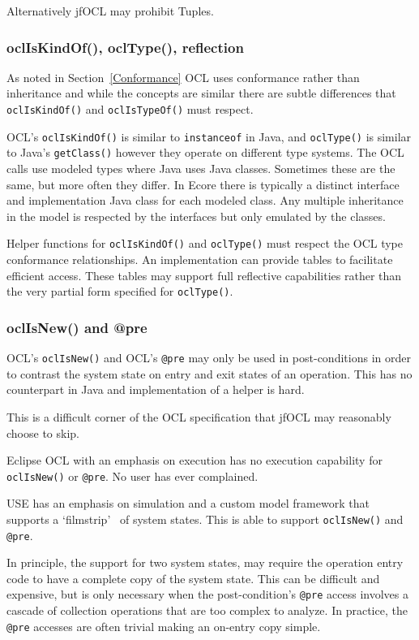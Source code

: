 \documentclass[sigconf]{acmart}
\begin{document}
Alternatively jfOCL may prohibit Tuples.

\subsubsection{oclIsKindOf(), oclType(), reflection}

As noted in Section~\ref{Conformance} OCL uses conformance rather than inheritance and while the concepts are similar there are subtle differences that \texttt{oclIsKindOf()} and \texttt{oclIsTypeOf()} must respect.

OCL's \texttt{oclIsKindOf()} is similar to \texttt{instanceof} in Java, and
\texttt{oclType()} is similar to Java's \texttt{getClass()} however they operate on different type systems. The OCL calls use modeled types where Java uses Java classes. Sometimes these are the same, but more often they differ. In Ecore there is typically a distinct interface and implementation Java class for each modeled class. Any multiple inheritance in the model is respected by the interfaces but only emulated by the classes.

Helper functions for \texttt{oclIsKindOf()} and \texttt{oclType()} must respect the OCL type conformance relationships. An implementation can provide tables to facilitate efficient access. These tables may support full reflective capabilities rather than the very partial form specified for \texttt{oclType()}.

\subsubsection{oclIsNew() and @pre}

OCL's \texttt{oclIsNew()} and OCL's \texttt{@pre} may only be used in post-conditions in order to contrast the system state on entry and exit states of an operation. This has no counterpart in Java and implementation of a helper is hard.

This is a difficult corner of the OCL specification that jfOCL may reasonably choose to skip.

Eclipse OCL\cite{Eclipse-OCL} with an emphasis on execution has no execution capability for \texttt{oclIsNew()} or \texttt{@pre}. No user has ever complained.

USE\cite{USE} has an emphasis on simulation and a custom model framework that supports a `filmstrip'~\cite{Desai} of system states. This is able to support \texttt{oclIsNew()} and \texttt{@pre}.

In principle, the support for two system states, may require the operation entry code to have a complete copy of the system state. This can be difficult and expensive, but is only necessary when the post-condition's \texttt{@pre} access involves a cascade of collection operations that are too complex to analyze. In practice, the \texttt{@pre} accesses are often trivial making an on-entry copy simple.
\end{document}
